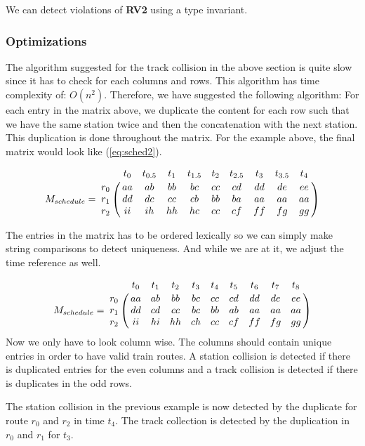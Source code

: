 \documentclass[10pt,a4paper]{article}
\let\bbordermatrix\bordermatrix
\begin{document}
We can detect violations of \textbf{RV2} using a type invariant.
\subsubsection{Optimizations}
\label{sec:optimizations}
 
The algorithm suggested for the track collision in the above section is quite slow since it has to check for each columns and rows. This algorithm has time complexity of: $O(n^2)$.
Therefore, we have suggested the following algorithm:
For each entry in the matrix above, we duplicate the content for each row such that we have the same station twice and then the concatenation with the next station. This duplication is done throughout the matrix. For the example above, the final matrix would look like (\ref{eq:sched2}).

\begin{equation}
M_{schedule} = \bbordermatrix{
                    ~ & t_0 & t_{0.5} & t_1 & t_{1.5} & t_2 & t_{2.5} & t_3 & t_{3.5} & t_4 \cr
                  r_0 & aa  &  ab     & bb  &  bc     & cc  &  cd     & dd  & de      & ee\cr
                  r_1 & dd  &  dc     & cc  &  cb     & bb  &  ba     & aa  & aa      & aa\cr
                  r_2 & ii  &  ih     & hh  &  hc     & cc  &  cf     & ff  & fg      & gg}
\label{eq:sched2}
\end{equation}

The entries in the matrix has to be ordered lexically so we can simply make string comparisons to detect uniqueness. And while we are at it, we adjust the time reference as well.

\begin{equation}
M_{schedule} = \bbordermatrix{
                    ~ & t_0 & t_1 & t_2 & t_3 & t_4 & t_5 & t_6 & t_7 & t_8 \cr
                  r_0 & aa  & ab  & bb  & bc  & cc  & cd  & dd  & de  & ee\cr
                  r_1 & dd  & cd  & cc  & bc  & bb  & ab  & aa  & aa  & aa\cr
                  r_2 & ii  & hi  & hh  & ch  & cc  & cf  & ff  & fg  & gg}
\label{eq:sched3}
\end{equation} 
Now we only have to look column wise. The columns should contain unique entries in order to have valid train routes.
A station collision is detected if there is duplicated entries for the even columns and a track collision is detected if there is duplicates in the odd rows.
 
The station collision in the previous example is now detected by the duplicate for route $r_0$ and $r_2$ in time $t_4$.
The track collection is detected by the duplication in $r_0$ and $r_1$ for $t_3$.
 
\end{document}
